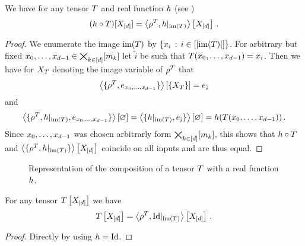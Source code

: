 \begin{theorem}\label{the:tensorFunctionComposition}
	We have for any tensor $T$ and real function $h$ (see )
		\[ (h\circ T)[X_{[d]}]
		= \left\langle \rho^{T},{h}|_{\mathrm{im}\left(T\right)}\right\rangle \left[ X_{[d]} \right] \, . \]
\end{theorem}
\begin{proof}
	We enumerate the image $\mathrm{im}(T)$ by $\{x_i \, : \, i \in [\left|\mathrm{im}(T)\right|]\}$.
	For arbitrary but fixed $x_{0},\ldots,x_{d-1}\in\bigtimes_{k\in[d]}[m_{k}]$ let $\tilde{i}$ be such that $T(x_{0},\ldots,x_{d-1}) = x_i$.
	Then we have for $X_{T}$ denoting the image variable of $\rho^{T}$ that
		\[ \left\langle \{\rho^{T},e_{x_{0},\ldots,x_{d-1}}\}\right\rangle \left[ \{X_{T}\} \right] = e_{\tilde{i}} \]
	and
		\[ \left\langle \{\rho^{T}, {h}|_{\mathrm{im}\left(T\right)}, e_{x_{0},\ldots,x_{d-1}}\}\right\rangle \left[ \varnothing \right] = 
		\left\langle \{{h}|_{\mathrm{im}\left(T\right)}, e_{\tilde{i}}\}\right\rangle \left[ \varnothing \right] = 
		h(T(x_{0},\ldots,x_{d-1})) \, . 
		\]
	Since $x_{0},\ldots,x_{d-1}$ was chosen arbitrarly form $\bigtimes_{k\in[d]}[m_{k}]$, this shows that $h\circ T$ and $ \left\langle \{\rho^{T}, {h}|_{\mathrm{im}\left(T\right)}\}\right\rangle \left[ X_{[d]} \right]$ coincide on all inputs and are thus equal.
\end{proof}

\begin{figure}[h]
\begin{center}
	
\end{center}
\caption{Representation of the composition of a tensor $T$ with a real function $h$.}
\label{fig:tensorFunctionComposition} 
\end{figure}


\begin{corollary}\label{cor:rhoToNormal}
	For any tensor $T\left[X_{[d]}\right]$ we have
		\[ T\left[X_{[d]}\right] = \left\langle \rho^{T},{\mathrm{Id}}|_{\mathrm{im}\left(T\right)}\right\rangle \left[ X_{[d]} \right] \, . \]
\end{corollary}
\begin{proof}
	Directly by using $h=\mathrm{Id}$.
\end{proof}

